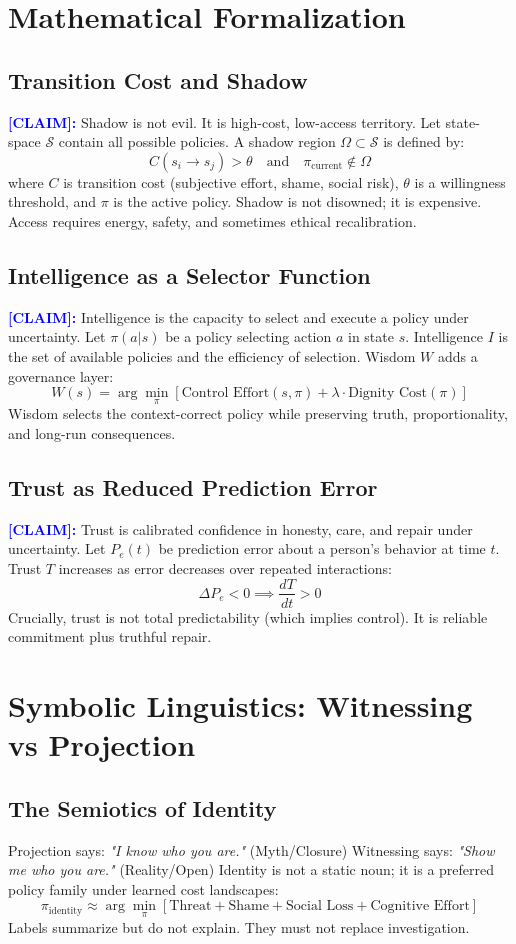\documentclass[11pt, a4paper]{article}
\newcommand{\claim}[1]{\noindent\textbf{\textcolor{blue}{[CLAIM]:}} #1}
\begin{document}
\section{Mathematical Formalization}
\subsection{Transition Cost and Shadow}
\claim{Shadow is not evil. It is high-cost, low-access territory.}
Let state-space $\mathcal{S}$ contain all possible policies. A shadow region $\Omega \subset \mathcal{S}$ is defined by:
\[
C(s_i \to s_j) > \theta \quad \text{and} \quad \pi_{\text{current}} \notin \Omega
\]
where $C$ is transition cost (subjective effort, shame, social risk), $\theta$ is a willingness threshold, and $\pi$ is the active policy. Shadow is not disowned; it is expensive. Access requires energy, safety, and sometimes ethical recalibration.

\subsection{Intelligence as a Selector Function}
\claim{Intelligence is the capacity to select and execute a policy under uncertainty.}
Let $\pi(a|s)$ be a policy selecting action $a$ in state $s$. Intelligence $I$ is the set of available policies and the efficiency of selection. Wisdom $W$ adds a governance layer:
\[
W(s) = \arg\min_{\pi} \left[ \text{Control Effort}(s, \pi) + \lambda \cdot \text{Dignity Cost}(\pi) \right]
\]
Wisdom selects the context-correct policy while preserving truth, proportionality, and long-run consequences.

\subsection{Trust as Reduced Prediction Error}
\claim{Trust is calibrated confidence in honesty, care, and repair under uncertainty.}
Let $P_e(t)$ be prediction error about a person's behavior at time $t$. Trust $T$ increases as error decreases over repeated interactions:
\[
\Delta P_e < 0 \implies \frac{dT}{dt} > 0
\]
Crucially, trust is not total predictability (which implies control). It is reliable commitment plus truthful repair.

\section{Symbolic Linguistics: Witnessing vs Projection}
\subsection{The Semiotics of Identity}
Projection says: \textit{"I know who you are."} (Myth/Closure)
Witnessing says: \textit{"Show me who you are."} (Reality/Open)
Identity is not a static noun; it is a preferred policy family under learned cost landscapes:
\[
\pi_{\text{identity}} \approx \arg\min_{\pi} \left[ \text{Threat} + \text{Shame} + \text{Social Loss} + \text{Cognitive Effort} \right]
\]
Labels summarize but do not explain. They must not replace investigation.
\end{document}
